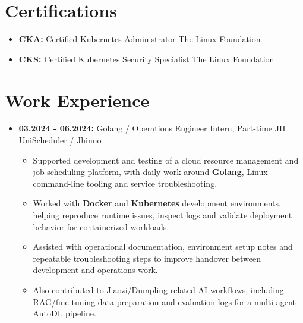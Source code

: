 \documentclass[10pt,a4paper]{article}
\newcommand{\cvright}[1]{\hfill{\normalfont #1}}
\newcommand{\cvrole}[3]{%
  \item \textbf{#1:} #2 \cvright{#3}
}
\begin{document}
\section*{Certifications}
\begin{itemize}
  \item \textbf{CKA:} Certified Kubernetes Administrator \cvright{The Linux Foundation}
  \item \textbf{CKS:} Certified Kubernetes Security Specialist \cvright{The Linux Foundation}
\end{itemize}

\section*{Work Experience}
\begin{itemize}
  \cvrole{03.2024 - 06.2024}{Golang / Operations Engineer Intern, Part-time}{JH UniScheduler / Jhinno}
    \begin{itemize}
      \item Supported development and testing of a cloud resource management and job scheduling platform, with daily work around \textbf{Golang}, Linux command-line tooling and service troubleshooting.
      \item Worked with \textbf{Docker} and \textbf{Kubernetes} development environments, helping reproduce runtime issues, inspect logs and validate deployment behavior for containerized workloads.
      \item Assisted with operational documentation, environment setup notes and repeatable troubleshooting steps to improve handover between development and operations work.
      \item Also contributed to Jiaozi/Dumpling-related AI workflows, including RAG/fine-tuning data preparation and evaluation logs for a multi-agent AutoDL pipeline.
    \end{itemize}
\end{itemize}
\end{document}

